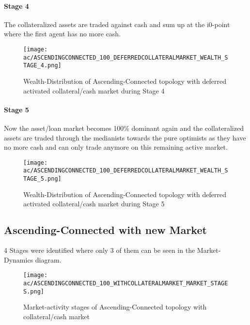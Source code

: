 \documentclass[Bachelorarbeit.tex]{subfiles}
\begin{document}
\paragraph{Stage 4}
The collateralized assets are traded against cash and sum up at the i0-point where the first agent has no more cash. 

\begin{figure}[H]
	\centering
  \texttt{[image: ac/ASCENDINGCONNECTED\_100\_DEFERREDCOLLATERALMARKET\_WEALTH\_STAGE\_4.png]}
  	\caption{Wealth-Distribution of Ascending-Connected topology with deferred activated collateral/cash market during Stage 4}
	\label{fig:markets_ASCENDINGCONNECTED_100_DEFERREDCOLLATERALMARKET_WEALTH_STAGE_4}
\end{figure}

\paragraph{Stage 5}
Now the asset/loan market becomes 100\% dominant again and the collateralized assets are traded through the medianists towards the pure optimists as they have no more cash and can only trade anymore on this remaining active market.

\begin{figure}[H]
	\centering
  \texttt{[image: ac/ASCENDINGCONNECTED\_100\_DEFERREDCOLLATERALMARKET\_WEALTH\_STAGE\_5.png]}
  	\caption{Wealth-Distribution of Ascending-Connected topology with deferred activated collateral/cash market during Stage 5}	\label{fig:markets_ASCENDINGCONNECTED_100_DEFERREDCOLLATERALMARKET_WEALTH_STAGE_5}
\end{figure}

\subsection{Ascending-Connected with new Market}

4 Stages were identified where only 3 of them can be seen in the Market-Dynamics diagram.

\begin{figure}[H]
	\centering
  \texttt{[image: ac/ASCENDINGCONNECTED\_100\_WITHCOLLATERALMARKET\_MARKET\_STAGES.png]}
  	\caption{Market-activity stages of Ascending-Connected topology with collateral/cash market}
	\label{fig:markets_ASCENDINGCONNECTED_100_WITHCOLLATERALMARKET_MARKET_STAGES}
\end{figure}
\end{document}
